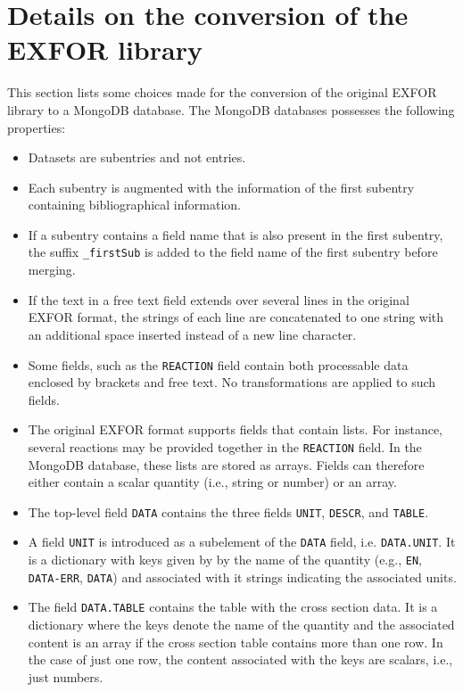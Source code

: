 \documentclass[12pt,a4paper]{scrartcl}
\begin{document}
 \section{Details on the conversion of the EXFOR library}
 \label{sec:conversion_details}
 This section lists some choices made for the conversion of the original EXFOR library to a MongoDB database.
 The MongoDB databases possesses the following properties:
\begin{itemize}
\item Datasets are subentries and not entries.
\item Each subentry is augmented with the information of the first subentry containing bibliographical information.
\item If a subentry contains a field name that is also present in the first subentry, the suffix \verb|_firstSub| is added to the field name of the first subentry before merging.
\item If the text in a free text field extends over several lines in the original EXFOR format, the strings of each line are concatenated to one string with an additional space inserted instead of a new line character.
\item Some fields, such as the \verb|REACTION| field contain both processable data enclosed by brackets and free text.
No transformations are applied to such fields.
\item The original EXFOR format supports fields that contain lists.
For instance, several reactions may be provided together in the \verb|REACTION| field.
In the MongoDB database, these lists are stored as arrays.
Fields can therefore either contain a scalar quantity (i.e., string or number) or an array.
\item The top-level field \verb|DATA| contains the three fields \verb|UNIT|, \verb|DESCR|, and \verb|TABLE|.
\item A field \verb|UNIT| is introduced as a subelement of the \verb|DATA| field, i.e. \verb|DATA.UNIT|. It is a dictionary with keys given by by the name of the quantity (e.g., \verb|EN|, \verb|DATA-ERR|, \verb|DATA|) and associated with it strings indicating the associated units.
\item The field \verb|DATA.TABLE| contains the table with the cross section data.
It is a dictionary where the keys denote the name of the quantity and the associated content is an array if the cross section table contains more than one row.
In the case of just one row, the content associated with the keys are scalars, i.e., just numbers.

\end{itemize}
\end{document}
